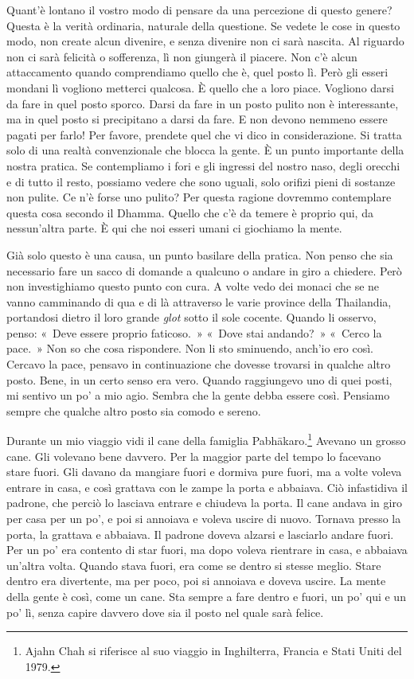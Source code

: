 Quant'è lontano il vostro modo di pensare da una percezione di questo
genere? Questa è la verità ordinaria, naturale della questione. Se
vedete le cose in questo modo, non create alcun divenire, e senza
divenire non ci sarà nascita. Al riguardo non ci sarà felicità o
sofferenza, lì non giungerà il piacere. Non c'è alcun attaccamento
quando comprendiamo quello che è, quel posto lì. Però gli esseri mondani
lì vogliono metterci qualcosa. È quello che a loro piace. Vogliono darsi
da fare in quel posto sporco. Darsi da fare in un posto pulito non è
interessante, ma in quel posto si precipitano a darsi da fare. E non
devono nemmeno essere pagati per farlo! Per favore, prendete quel che vi
dico in considerazione. Si tratta solo di una realtà convenzionale che
blocca la gente. È un punto importante della nostra pratica. Se
contempliamo i fori e gli ingressi del nostro naso, degli orecchi e di
tutto il resto, possiamo vedere che sono uguali, solo orifizi pieni di
sostanze non pulite. Ce n'è forse uno pulito? Per questa ragione
dovremmo contemplare questa cosa secondo il Dhamma. Quello che c'è da
temere è proprio qui, da nessun'altra parte. È qui che noi esseri umani
ci giochiamo la mente.

Già solo questo è una causa, un punto basilare della pratica. Non penso
che sia necessario fare un sacco di domande a qualcuno o andare in giro
a chiedere. Però non investighiamo questo punto con cura. A volte vedo
dei monaci che se ne vanno camminando di qua e di là attraverso le varie
province della Thailandia, portandosi dietro il loro grande \emph{glot}
sotto il sole cocente. Quando li osservo, penso: «~Deve essere proprio
faticoso.~» «~Dove stai andando?~» «~Cerco la pace.~» Non so che cosa
rispondere. Non li sto sminuendo, anch'io ero così. Cercavo la pace,
pensavo in continuazione che dovesse trovarsi in qualche altro posto.
Bene, in un certo senso era vero. Quando raggiungevo uno di quei posti,
mi sentivo un po' a mio agio. Sembra che la gente debba essere così.
Pensiamo sempre che qualche altro posto sia comodo e sereno.

Durante un mio viaggio vidi il cane della famiglia Pabhākaro.\footnote{Ajahn
  Chah si riferisce al suo viaggio in Inghilterra, Francia e Stati Uniti
  del 1979.} Avevano un grosso cane. Gli volevano bene davvero. Per la
maggior parte del tempo lo facevano stare fuori. Gli davano da mangiare
fuori e dormiva pure fuori, ma a volte voleva entrare in casa, e così
grattava con le zampe la porta e abbaiava. Ciò infastidiva il padrone,
che perciò lo lasciava entrare e chiudeva la porta. Il cane andava in
giro per casa per un po', e poi si annoiava e voleva uscire di nuovo.
Tornava presso la porta, la grattava e abbaiava. Il padrone doveva
alzarsi e lasciarlo andare fuori. Per un po' era contento di star fuori,
ma dopo voleva rientrare in casa, e abbaiava un'altra volta. Quando
stava fuori, era come se dentro si stesse meglio. Stare dentro era
divertente, ma per poco, poi si annoiava e doveva uscire. La mente della
gente è così, come un cane. Sta sempre a fare dentro e fuori, un po' qui
e un po' lì, senza capire davvero dove sia il posto nel quale sarà
felice.

